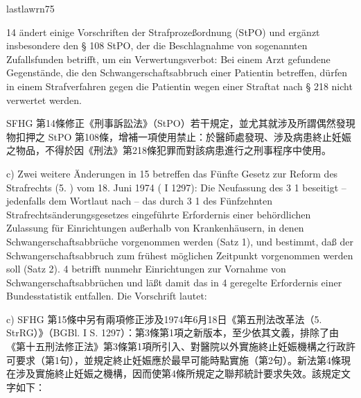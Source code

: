 \documentclass[12pt]{article}
\begin{document}
\begin{transboxpara}
\begin{lawboxpart}{last}{lawrn75}
\end{lawboxpart}
\end{transboxpara}

\begin{sourcepara}[title={原文理由 A.II.3.b StPO}]
\abbrArt{} 14 \abbrSFHG{} ändert einige Vorschriften der Strafprozeßordnung (StPO) und ergänzt insbesondere den § 108 StPO, der die Beschlagnahme von sogenannten Zufallsfunden betrifft, um ein Verwertungsverbot: Bei einem Arzt gefundene Gegenstände, die den Schwangerschaftsabbruch einer Patientin betreffen, dürfen in einem Strafverfahren gegen die Patientin wegen einer Straftat nach § 218 \abbrStGB{} nicht verwertet werden.
\end{sourcepara}
\begin{transpara}
SFHG 第14條修正《刑事訴訟法》（StPO）若干規定，並尤其就涉及所謂偶然發現物扣押之 StPO 第108條，增補一項使用禁止：於醫師處發現、涉及病患終止妊娠之物品，不得於因《刑法》第218條犯罪而對該病患進行之刑事程序中使用。
\end{transpara}

\begin{sourcepara}[title={原文理由 A.II.3.c}]
c) Zwei weitere Änderungen in \abbrArt{} 15 \abbrSFHG{} betreffen das Fünfte Gesetz zur Reform des Strafrechts (5. \abbrStrRG{}) vom 18. Juni 1974 (\abbrBGBl{} I \abbrS{} 1297): Die Neufassung des \abbrArt{} 3 \abbrAbs{} 1 beseitigt -- jedenfalls dem Wortlaut nach -- das durch \abbrArt{} 3 \abbrAbs{} 1 des Fünfzehnten Strafrechtsänderungsgesetzes eingeführte Erfordernis einer behördlichen Zulassung für Einrichtungen außerhalb von Krankenhäusern, in denen Schwangerschaftsabbrüche vorgenommen werden (Satz 1), und bestimmt, daß der Schwangerschaftsabbruch zum frühest möglichen Zeitpunkt vorgenommen werden soll (Satz 2). \abbrArt{} 4 \abbrNF{} betrifft nunmehr Einrichtungen zur Vornahme von Schwangerschaftsabbrüchen und läßt damit das in \abbrArt{} 4 geregelte Erfordernis einer Bundesstatistik entfallen. Die Vorschrift lautet:
\end{sourcepara}
\begin{transpara}
c) SFHG 第15條中另有兩項修正涉及1974年6月18日《第五刑法改革法（5. StrRG）》（BGBl. I S. 1297）：第3條第1項之新版本，至少依其文義，排除了由《第十五刑法修正法》第3條第1項所引入、對醫院以外實施終止妊娠機構之行政許可要求（第1句），並規定終止妊娠應於最早可能時點實施（第2句）。新法第4條現在涉及實施終止妊娠之機構，因而使第4條所規定之聯邦統計要求失效。該規定文字如下：
\end{transpara}
\end{document}
